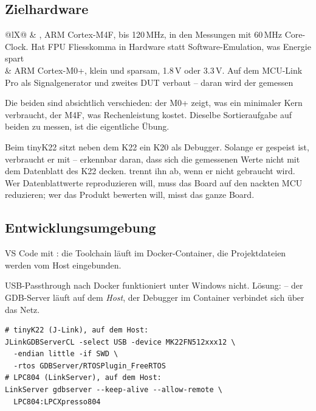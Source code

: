 \subsection{Zielhardware}
\begin{ztab}{@{}lX@{}}
 & , ARM Cortex-M4F, bis 120\,MHz, in den
  Messungen mit 60\,MHz Core-Clock. Hat FPU \ra Fliesskomma in Hardware
  statt Software-Emulation, was Energie spart \\
 & ARM Cortex-M0+, klein und sparsam, 1.8\,V oder 3.3\,V.
  Auf dem MCU-Link Pro als Signalgenerator und zweites DUT verbaut --
  daran wird der  gemessen \\
\end{ztab}
\merkzeile Die beiden sind absichtlich verschieden: der M0+ zeigt, was
ein minimaler Kern verbraucht, der M4F, was Rechenleistung kostet.
Dieselbe Sortieraufgabe auf beiden zu messen, ist die eigentliche
Übung.

\begin{falle}
Beim tinyK22 sitzt neben dem K22 ein K20 als Debugger. Solange er
gespeist ist, verbraucht er mit -- erkennbar daran, dass sich die
gemessenen Werte nicht mit dem Datenblatt des K22 decken.
 trennt ihn ab, wenn er nicht gebraucht wird. Wer
Datenblattwerte reproduzieren will, muss das Board auf den nackten MCU
reduzieren; wer das Produkt bewerten will, misst das ganze Board.
\end{falle}

\subsection{Entwicklungsumgebung}
VS Code mit : die Toolchain läuft im Docker-Container,
die Projektdateien werden vom Host eingebunden.
\begin{falle}
USB-Passthrough nach Docker funktioniert unter Windows nicht. Lösung:
 -- der GDB-Server läuft auf dem \emph{Host}, der
Debugger im Container verbindet sich über das Netz.
\begin{lstlisting}
# tinyK22 (J-Link), auf dem Host:
JLinkGDBServerCL -select USB -device MK22FN512xxx12 \
  -endian little -if SWD \
  -rtos GDBServer/RTOSPlugin_FreeRTOS
# LPC804 (LinkServer), auf dem Host:
LinkServer gdbserver --keep-alive --allow-remote \
  LPC804:LPCXpresso804
\end{lstlisting}
\end{falle}

